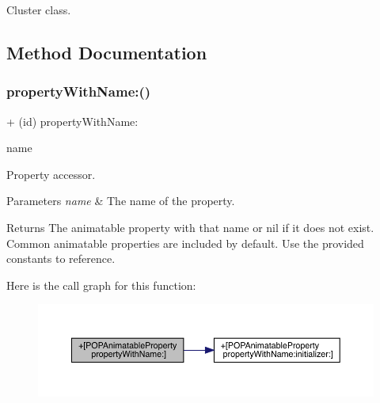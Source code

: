 Cluster class. 

\subsection{Method Documentation}
\mbox{\label{interface_p_o_p_animatable_property_ad11b0dd7ba703f4ba087052ce57c12b4}} 
\subsubsection{\texorpdfstring{property\+With\+Name\+:()}{propertyWithName:()}\hspace{0.1cm}{\footnotesize\ttfamily [1/3]}}
{\footnotesize\ttfamily + (id) property\+With\+Name\+: \begin{DoxyParamCaption}\item[{(N\+S\+String $\ast$)}]{name }\end{DoxyParamCaption}}

Property accessor. 
\begin{DoxyParams}{Parameters}
{\em name} & The name of the property. \\
\hline
\end{DoxyParams}
\begin{DoxyReturn}{Returns}
The animatable property with that name or nil if it does not exist.  Common animatable properties are included by default. Use the provided constants to reference. 
\end{DoxyReturn}
Here is the call graph for this function\+:\nopagebreak
\begin{figure}[H]
\begin{center}
\leavevmode
\includegraphics[width=350pt]{interface_p_o_p_animatable_property_ad11b0dd7ba703f4ba087052ce57c12b4_cgraph}
\end{center}
\end{figure}
\mbox{\label{interface_p_o_p_animatable_property_ad11b0dd7ba703f4ba087052ce57c12b4}} 
